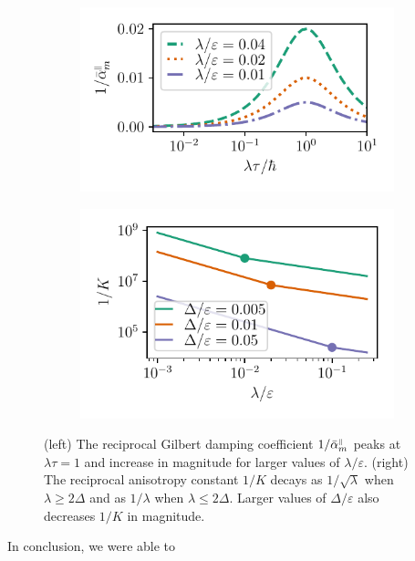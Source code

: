 \begin{figure}
\begin{subfigure}{.5\textwidth}
  \centering
  \includegraphics[width=.95\linewidth]{gfx/inverse_alpha.pdf}
\end{subfigure}%
\begin{subfigure}{.5\textwidth}
  \centering
  \includegraphics[width=.88\linewidth]{gfx/inverse_K.pdf}
\end{subfigure}
\caption{(left) The reciprocal Gilbert damping coefficient $1/\bar{\alpha}_m^{{\scriptscriptstyle\parallel}}$ peaks at $\lambda\tau=1$ and increase in magnitude for larger values of $\lambda/\varepsilon$. (right) The reciprocal anisotropy constant $1/K$ decays as $1/\sqrt{\lambda}$ when $\lambda\geq2\Delta$ and as $1/{\lambda}$ when $\lambda\leq2\Delta$. Larger values of $\Delta/\varepsilon$ also decreases $1/K$ in magnitude.}
\label{fig:max}
\end{figure}

In conclusion, we were able to 